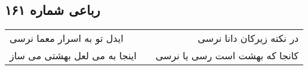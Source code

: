 \begin{center}
\section*{رباعی شماره ۱۶۱}
\label{sec:sh161}
\begin{longtable}{l p{0.5cm} r}
ایدل تو به اسرار معما نرسی
&&
در نکته زیرکان دانا نرسی
\\
اینجا به می لعل بهشتی می ساز
&&
کانجا که بهشت است رسی یا نرسی
\\
\end{longtable}
\end{center}

